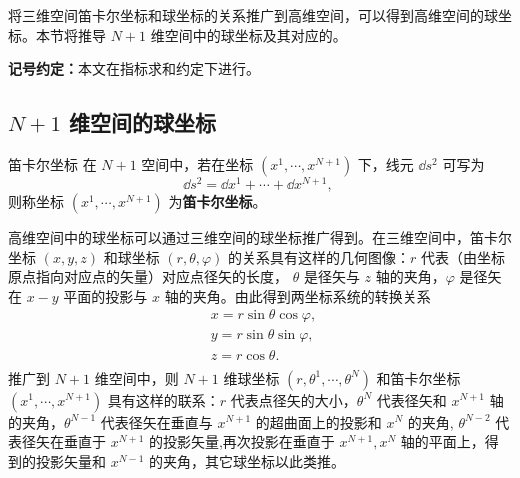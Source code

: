 
将三维空间笛卡尔坐标和球坐标的关系推广到高维空间，可以得到高维空间的球坐标。本节将推导 $N+1$ 维空间中的球坐标及其对应的。

\textbf{记号约定：}本文在指标求和约定下进行。

\subsection{$N+1$ 维空间的球坐标}
\begin{definition}{笛卡尔坐标}\label{def_nDSM_1}
在 $N+1$ 空间中，若在坐标 $(x^1,\cdots,x^{N+1})$ 下，线元 $\dd s^2$ 可写为
\begin{equation}\label{eq_nDSM_2}
\dd s^2=\dd x^1+\cdots+\dd x^{N+1},~
\end{equation}
 则称坐标 $(x^1,\cdots,x^{N+1})$ 为\textbf{笛卡尔坐标}。
\end{definition}

高维空间中的球坐标可以通过三维空间的球坐标推广得到。在三维空间中，笛卡尔坐标 $(x,y,z)$ 和球坐标 $(r,\theta,\varphi)$ 的关系具有这样的几何图像：$r$ 代表（由坐标原点指向对应点的矢量）对应点径矢的长度， $\theta$ 是径矢与 $z$ 轴的夹角，$\varphi$ 是径矢在 $x-y$ 平面的投影与 $x$ 轴的夹角。由此得到两坐标系统的转换关系
\begin{equation}
\begin{aligned}
&x=r\sin\theta\cos\varphi,\\
&y=r\sin\theta\sin\varphi,\\
&z=r\cos\theta.\\
\end{aligned}~
\end{equation}
推广到 $N+1$ 维空间中，则 $N+1$ 维球坐标 $(r,\theta^1,\cdots,\theta^{N})$ 和笛卡尔坐标 $(x^1,\cdots,x^{N+1})$ 具有这样的联系：$r$ 代表点径矢的大小，$\theta^{N}$ 代表径矢和 $x^{N+1}$ 轴的夹角，$\theta^{N-1}$ 代表径矢在垂直与 $x^{N+1}$ 的超曲面上的投影和 $x^{N}$ 的夹角, $\theta^{N-2}$ 代表径矢在垂直于 $x^{N+1}$ 的投影矢量,再次投影在垂直于 $x^{N+1},x^{N}$ 轴的平面上，得到的投影矢量和 $x^{N-1}$ 的夹角，其它球坐标以此类推。

